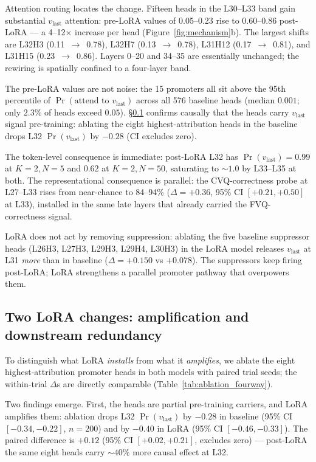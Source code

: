 \documentclass[11pt]{article}
\begin{document}
Attention routing locates the change. Fifteen heads in the
L30--L33 band gain substantial $v_{\text{last}}$ attention:
pre-LoRA values of 0.05--0.23 rise to 0.60--0.86 post-LoRA --- a
4--12$\times$ increase per head (Figure~\ref{fig:mechanism}b). The
largest shifts are L32H3 (0.11~$\to$~0.78), L32H7
(0.13~$\to$~0.78), L31H12 (0.17~$\to$~0.81), and L31H15
(0.23~$\to$~0.86). Layers 0--20 and 34--35 are essentially
unchanged; the rewiring is spatially confined to a four-layer band.

The pre-LoRA values are not noise: the 15 promoters all sit above
the 95th percentile of $\Pr(\text{attend to }v_{\text{last}})$
across all 576 baseline heads (median $0.001$; only $2.3\%$ of
heads exceed $0.05$).
\S\ref{sec:mechanism:causal} confirms causally that the heads
carry $v_{\text{last}}$ signal pre-training: ablating the eight
highest-attribution heads in the baseline drops L32
$\Pr(v_{\text{last}})$ by $-0.28$ (CI excludes zero).

The token-level consequence is immediate: post-LoRA L32 has
$\Pr(v_{\text{last}}) {=} 0.99$ at $K{=}2, N{=}5$ and $0.62$ at
$K{=}2, N{=}50$, saturating to $\sim 1.0$ by L33--L35 at both.
The representational consequence is parallel: the CVQ-correctness
probe at L27--L33 rises from near-chance to 84--94\% ($\Delta
{=} {+}0.36$, 95\% CI $[+0.21, +0.50]$ at L33), installed in the
same late layers that already carried the FVQ-correctness signal.

LoRA does not act by removing suppression: ablating the five
baseline suppressor heads (L26H3, L27H3, L29H3, L29H4, L30H3) in
the LoRA model releases $v_{\text{last}}$ at L31 \emph{more} than
in baseline ($\Delta{=}{+}0.150$ vs $+0.078$). The suppressors
keep firing post-LoRA; LoRA strengthens a parallel promoter
pathway that overpowers them.

\subsection{Two LoRA changes: amplification and downstream
redundancy}
\label{sec:mechanism:causal}

To distinguish what LoRA \emph{installs} from what it
\emph{amplifies}, we ablate the eight highest-attribution promoter
heads in both models with paired trial seeds; the within-trial
$\Delta$s are directly comparable (Table~\ref{tab:ablation_fourway}).

Two findings emerge. First, the heads are partial pre-training
carriers, and LoRA amplifies them: ablation drops L32
$\Pr(v_{\text{last}})$ by $-0.28$ in baseline (95\% CI
$[-0.34, -0.22]$, $n{=}200$) and by $-0.40$ in LoRA (95\% CI
$[-0.46, -0.33]$). The paired difference is $+0.12$ (95\% CI
$[+0.02, +0.21]$, excludes zero) --- post-LoRA the same eight
heads carry $\sim 40\%$ more causal effect at L32.
\end{document}
